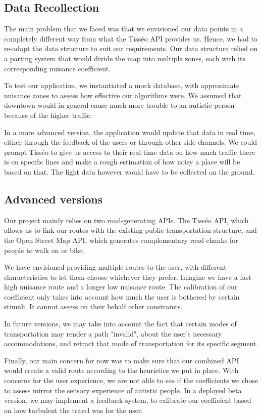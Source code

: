 \newpage


\subsection{Data Recollection}


The main problem that we faced was that we envisioned our data points in a completely different way from what the Tisséo API provides us. Hence, we had to re-adapt the data structure to suit our requirements. Our data structure relied on a parting system that would divide the map into multiple zones, each with its corresponding nuisance coefficient.


To test our application, we instantiated a mock database, with approximate nuisance zones to assess how effective our algorithms were. We assumed that downtown would in general cause much more trouble to an autistic person because of the higher traffic.


In a more advanced version, the application would update that data in real time, either through the feedback of the users or through other side channels. We could prompt Tisséo to give us access to their real-time data on how much traffic there is on specific lines and make a rough estimation of how noisy a place will be based on that. The light data however would have to be collected on the ground.


\subsection{Advanced versions}


Our project mainly relies on two road-generating APIs. The Tisséo API, which allows us to link our routes with the existing public transportation structure, and the Open Street Map API, which generates complementary road chunks for people to walk on or bike.


We have envisioned providing multiple routes to the user, with different characteristics to let them choose whichever they prefer. Imagine we have a fast high nuisance route and a longer low nuisance route. The calibration of our coefficient only takes into account how much the user is bothered by certain stimuli. It cannot assess on their behalf other constraints.


In future versions, we may take into account the fact that certain modes of transportation may render a path "invalid", about the user's necessary accommodations, and retract that mode of transportation for its specific segment.


Finally, our main concern for now was to make sure that our combined API would create a valid route according to the heuristics we put in place. With concerns for the user experience, we are not able to see if the coefficients we chose to assess mirror the sensory experience of autistic people. In a deployed beta version, we may implement a feedback system, to calibrate our coefficient based on how turbulent the travel was for the user.
